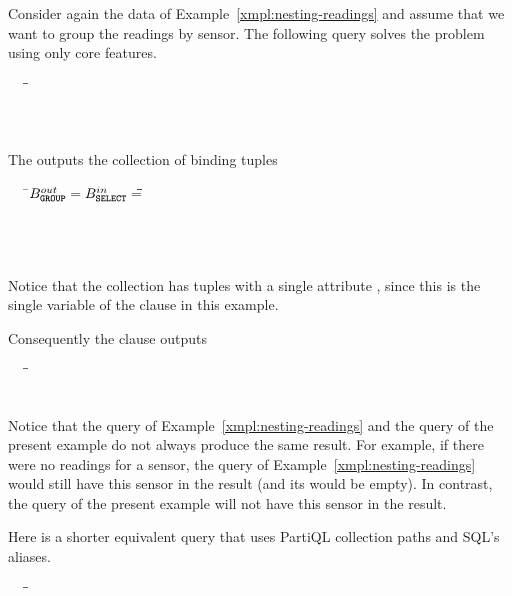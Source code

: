 \begin{example}
\label{sec:grouping-readings}
Consider again the  data of Example~\ref{xmpl:nesting-readings} and
assume that we want to group the  readings by sensor. The following query
solves the problem using only core features. 

\begin{tabbing}
\ \ \ \=\=\\
\>\>\\
\>\\
\>
\end{tabbing}
The  outputs the collection of binding tuples
\begin{tabbing}
\ \ \ \=$B^{out}_{\texttt{\textbf{GROUP}}} = B^{in}_{\texttt{\textbf{SELECT}}} =$\=\gt{\ob }\=\=\\ 
\>\>\>\>\\
\>\>\>\>\gt{\cb $\rangle$,}\\
\>\>\>\\
\>\>\gt{\cb}
\end{tabbing}

Notice that the collection  has tuples with a single attribute ,
since this is the single variable of the  clause in this example.

Consequently the  clause outputs
\begin{tabbing}
\ \ \ \=\gt{\ob }\=\\
\>\>\\
\>\gt{\cb}
\end{tabbing}
Notice that the query of Example~\ref{xmpl:nesting-readings} and the query of
the present example do not always produce the same result. For example, if there
were no readings for a sensor, the query of Example~\ref{xmpl:nesting-readings}
would still have this sensor in the result (and its  would be
empty). In contrast, the query of the present example will not have this sensor
in the result.

Here is a shorter equivalent query that uses PartiQL collection paths and SQL's
aliases.
\begin{tabbing}
\ \ \ \=\=\\
\>\>\\
\>\\
\>
\end{tabbing}
\end{example}

